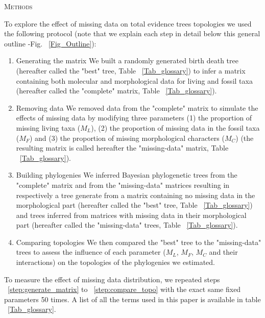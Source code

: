 \documentclass[12pt,letterpaper]{article}
\renewcommand{\section}[1]{%
\bigskip
\begin{center}
\begin{Large}
\normalfont\scshape #1
\medskip
\end{Large}
\end{center}}
\begin{document}

\section{Methods} %
To explore the effect of missing data on total evidence trees topologies we used the following protocol (note that we explain each step in detail below this general outline -Fig. ~\ref{Fig_Outline}):
\begin{enumerate}
\item{Generating the matrix}
\label{step:generate_matrix}
We built a randomly generated birth death tree (hereafter called the "best" tree, Table ~\ref{Tab_glossary}) to infer a matrix containing both molecular and morphological data for living and fossil taxa (hereafter called the "complete" matrix, Table ~\ref{Tab_glossary}).
\item{Removing data}
\label{step:remove_data}
We removed data from the "complete" matrix to simulate the effects of missing data by modifying three parameters (1) the proportion of missing living taxa ($M_{L}$), (2) the proportion of missing data in the fossil taxa ($M_{F}$) and (3) the proportion of missing morphological characters ($M_{C}$) (the resulting matrix is called hereafter the "missing-data" matrix, Table ~\ref{Tab_glossary}).
\item{Building phylogenies}
\label{step:build_phylo}
We inferred Bayesian phylogenetic trees from the "complete" matrix and from the "missing-data" matrices resulting in respectively a tree generate from a matrix containing no missing data in the morphological part (hereafter called the "best" tree, Table ~\ref{Tab_glossary}) and trees inferred from matrices with missing data in their morphological part (hereafter called the "missing-data" trees, Table ~\ref{Tab_glossary}).
\item{Comparing topologies}
\label{step:compare_topo}
We then compared the "best" tree to the "missing-data" trees to assess the influence of each parameter ($M_{L}$, $M_{F}$, $M_{C}$ and their interactions) on the topologies of the phylogenies we estimated.
\end{enumerate}
To measure the effect of missing data distribution, we repeated steps ~\ref{step:generate_matrix} to ~\ref{step:compare_topo} with the exact same fixed parameters 50 times. A list of all the terms used in this paper is available in table ~\ref{Tab_glossary}.
\end{document}
